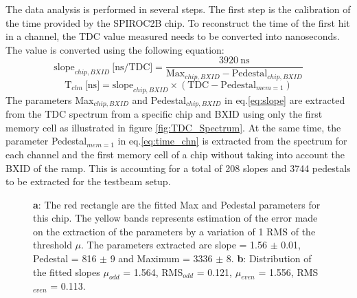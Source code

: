 \documentclass[twoside,a4paper,11pt]{article}
\begin{document}
The data analysis is performed in several steps. The first step is the calibration of the time provided by the SPIROC2B chip. To reconstruct the time of the first hit in a channel, the TDC value measured needs to be converted into nanoseconds. The value is converted using the following equation:
\begin{equation} \label{eq:slope}
 \text{slope}_{chip, BXID} \: \text{[ns/TDC]} = \frac{3920 \: \text{ns}}{\text{Max}_{chip, BXID} - \text{Pedestal}_{chip, BXID}}
\end{equation}
\begin{equation} \label{eq:time_chn}
\text{T}_{chn} \: \text{[ns]} = \text{slope}_{chip, BXID} \times (\text{TDC} - \text{Pedestal}_{mem=1} )
\end{equation}
The parameters Max$_{chip, BXID}$ and Pedestal$_{chip, BXID}$ in eq.\ref{eq:slope} are extracted from the TDC spectrum from a specific chip and BXID using only the first memory cell as illustrated in figure \ref{fig:TDC_Spectrum}. At the same time, the parameter Pedestal$_{mem=1}$ in eq.\ref{eq:time_chn} is extracted from the spectrum for each channel and the first memory cell of a chip without taking into account the BXID of the ramp. This is accounting for a total of 208 slopes and 3744 pedestals to be extracted for the testbeam setup.
\begin{figure}[htbp]
	\hfill
	\caption[]{\textbf{a}: The red rectangle are the fitted Max and Pedestal parameters for this chip. The yellow bands represents estimation of the error made on the extraction of the parameters by a variation of 1 RMS of the threshold $\mu$. The parameters extracted are slope = 1.56 $\pm$ 0.01, Pedestal = 816 $\pm$ 9 and Maximum = 3336 $\pm$ 8. \textbf{b}: Distribution of the fitted slopes $\mu_{odd}$ = 1.564, RMS$_{odd}$ = 0.121, $\mu_{even}$ = 1.556, RMS$_{even}$ = 0.113.}
\end{figure}
\end{document}
